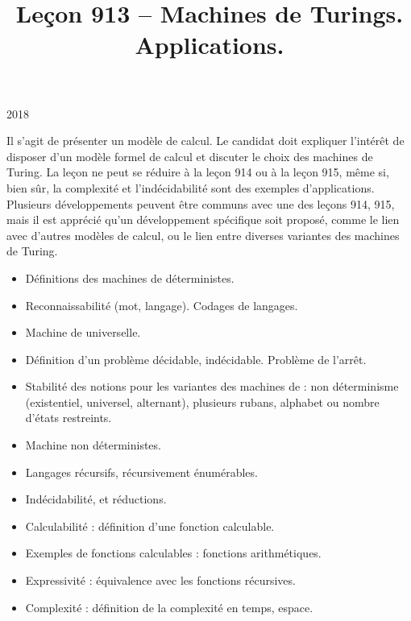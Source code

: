 \documentclass{agregfiche}
\title{Leçon 913 -- Machines de Turings. Applications.}
\begin{document}
\maketitle

\secrapports

\begin{rapport}{2018}

Il s'agit de présenter un modèle de calcul.
Le candidat doit expliquer l'intérêt de disposer d'un modèle formel de calcul et discuter le choix des machines de Turing.
La leçon ne peut se réduire à la leçon 914 ou à la leçon 915, même si, bien sûr, la complexité et l'indécidabilité sont des exemples d'applications.
Plusieurs développements peuvent être communs avec une des leçons 914, 915, mais il est apprécié qu'un développement spécifique soit proposé, comme le lien avec d'autres modèles de calcul, ou le lien entre diverses variantes des machines de Turing.

\end{rapport}

\secindispensables

\begin{itemize}
    \item Définitions des machines de  déterministes.
    \item Reconnaissabilité (mot, langage). Codages de langages. %
    \item Machine de  universelle.
    \item Définition d'un problème décidable, indécidable. Problème de l'arrêt.
\end{itemize}


\secasavoir


\begin{itemize}
  	\item Stabilité des notions pour les variantes des machines de  : non
          déterminisme (existentiel, universel, alternant),
          plusieurs rubans, alphabet ou nombre d'états restreints. %
        \item Machine non déterministes.
	\item Langages récursifs, récursivement énumérables.
	\item Indécidabilité,   et réductions.
	\item Calculabilité : définition d'une fonction calculable.
	\item Exemples de fonctions calculables : fonctions arithmétiques.
	\item Expressivité : équivalence avec les fonctions récursives.
	\item Complexité : définition de la complexité en temps, espace.
\end{itemize}
\end{document}

